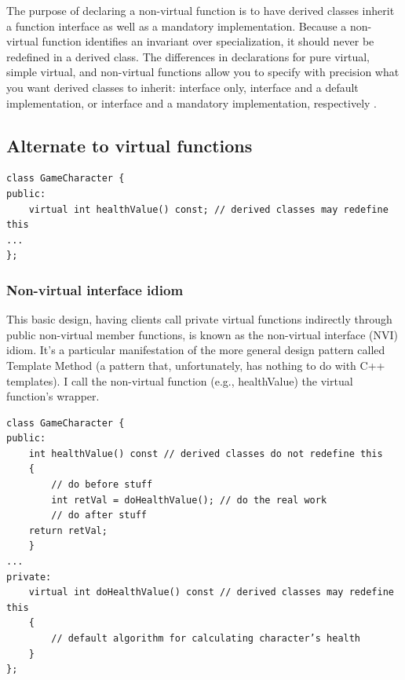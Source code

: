 \documentclass[a4paper,12pt,notitlepage]{article}
\begin{document}
The purpose of declaring a non-virtual function is to have derived classes inherit a function interface as well as a mandatory implementation. Because a non-virtual function identifies an invariant over specialization, it should never be redefined in a derived class. The differences in declarations for pure virtual, simple virtual, and non-virtual functions allow you to specify with precision what you
want derived classes to inherit: interface only, interface and a default implementation, or interface and a mandatory implementation, respectively \cite{Meyers_eff}.


\subsection{Alternate to virtual functions}

\begin{verbatim}
class GameCharacter {
public:
    virtual int healthValue() const; // derived classes may redefine this
...
};
\end{verbatim}

\subsubsection{Non-virtual interface idiom}

\noindent
This basic design, having clients call private virtual functions indirectly through public non-virtual member functions, is known as the non-virtual interface (NVI) idiom. It's a particular manifestation of
the more general design pattern called Template Method (a pattern that, unfortunately, has nothing to do with C++ templates). I call the non-virtual function (e.g., healthValue) the virtual function's wrapper.

\begin{verbatim}
class GameCharacter {
public:
    int healthValue() const // derived classes do not redefine this
    {
        // do before stuff
        int retVal = doHealthValue(); // do the real work
        // do after stuff
    return retVal;
    }
...
private:
    virtual int doHealthValue() const // derived classes may redefine this
    {
        // default algorithm for calculating character’s health
    }
};
\end{verbatim}
\end{document}

